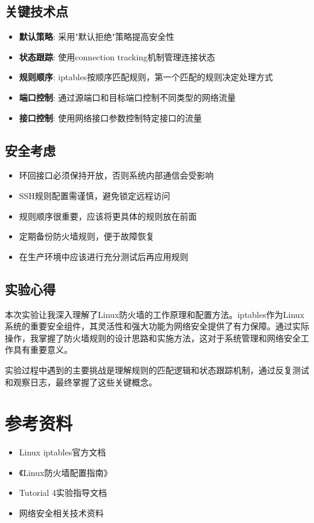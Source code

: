 \documentclass[12pt,a4paper]{article}
\begin{document}
\subsection{关键技术点}
\begin{itemize}
    \item \textbf{默认策略}: 采用"默认拒绝"策略提高安全性
    \item \textbf{状态跟踪}: 使用connection tracking机制管理连接状态
    \item \textbf{规则顺序}: iptables按顺序匹配规则，第一个匹配的规则决定处理方式
    \item \textbf{端口控制}: 通过源端口和目标端口控制不同类型的网络流量
    \item \textbf{接口控制}: 使用网络接口参数控制特定接口的流量
\end{itemize}

\subsection{安全考虑}
\begin{itemize}
    \item 环回接口必须保持开放，否则系统内部通信会受影响
    \item SSH规则配置需谨慎，避免锁定远程访问
    \item 规则顺序很重要，应该将更具体的规则放在前面
    \item 定期备份防火墙规则，便于故障恢复
    \item 在生产环境中应该进行充分测试后再应用规则
\end{itemize}

\subsection{实验心得}
本次实验让我深入理解了Linux防火墙的工作原理和配置方法。iptables作为Linux系统的重要安全组件，其灵活性和强大功能为网络安全提供了有力保障。通过实际操作，我掌握了防火墙规则的设计思路和实施方法，这对于系统管理和网络安全工作具有重要意义。

实验过程中遇到的主要挑战是理解规则的匹配逻辑和状态跟踪机制，通过反复测试和观察日志，最终掌握了这些关键概念。

\section{参考资料}
\begin{itemize}
    \item Linux iptables官方文档
    \item 《Linux防火墙配置指南》
    \item Tutorial 4实验指导文档
    \item 网络安全相关技术资料
\end{itemize}
\end{document}

